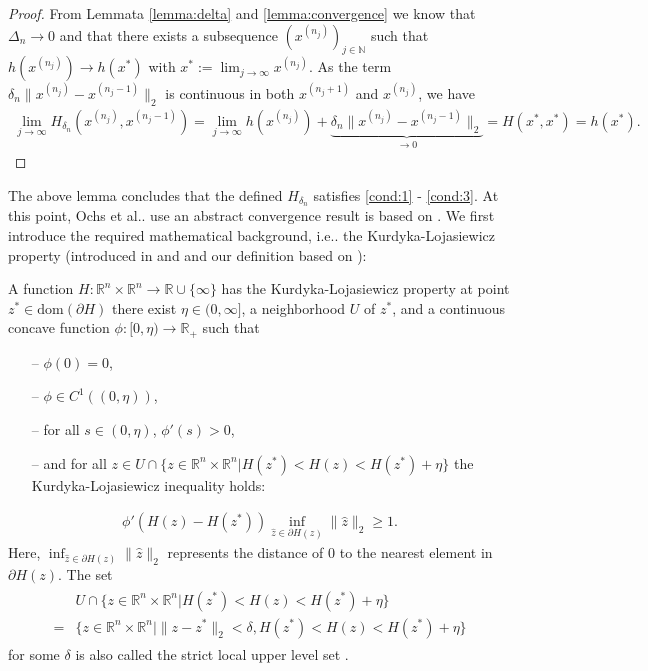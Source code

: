 \documentclass[onecolumn,final,a4paper,13pt,reqno]{siamart}
\makeatletter
\DeclareRobustCommand\onedot{\futurelet\@let@token\@onedot}
\def\@onedot{\ifx\@let@token.\else.\null\fi\xspace}
\def\ie{{i.e}\onedot} \def\Ie{{I.e}\onedot}
\def\etal{{et al}\onedot}
\def\dom{\text{dom}}
\makeatother
\begin{document}
\begin{proof}
	From Lemmata \ref{lemma:delta} and \ref{lemma:convergence} we know that $\Delta_n \rightarrow 0$ and that there exists a subsequence $(x^{(n_j)})_{j \in \mathbb{N}}$ such that $h(x^{(n_j)}) \rightarrow h(x^\ast)$ with $x^\ast := \lim_{j \rightarrow \infty} x^{(n_j)}$. As the term $\delta_n \|x^{(n_j)} - x^{(n_j - 1)}\|_2$ is continuous in both $x^{(n_j + 1)}$ and $x^{(n_j)}$, we have
	\begin{align}
		\lim_{j \rightarrow \infty} H_{\delta_n}(x^{(n_j)}, x^{(n_j - 1)})  = \lim_{j \rightarrow \infty} h(x^{(n_j)}) + \underbrace{\delta_n\|x^{(n_j)} - x^{(n_j - 1)}\|_2}_{\rightarrow 0} = H(x^\ast, x^\ast) = h(x^\ast).
	\end{align}
\end{proof}

The above lemma concludes that the defined $H_{\delta_n}$ satisfies \ref{cond:1} - \ref{cond:3}. At this point, Ochs \etal use an abstract convergence result is based on \cite{AttouchBolteSvaiter:2013}. We first introduce the required mathematical background, \ie the Kurdyka-Lojasiewicz property (introduced in \cite{Lojasiewicz:1993} and \cite{Kurdyka:1998} and our definition based on \cite{AttouchBolteRedontSoubeyran:2010}):

\begin{definitionmd}
	A function $H : \mathbb{R}^n \times \mathbb{R}^n \rightarrow \mathbb{R} \cup \{\infty\}$ has the Kurdyka-Lojasiewicz property at point $z^\ast \in \dom(\partial H)$ there exist $\eta \in (0,\infty]$, a neighborhood $U$ of $z^\ast$, and a continuous concave function $\phi : [0, \eta) \rightarrow \mathbb{R}_{+}$ such that
	\begin{itemize}
		\item[--] $\phi(0) = 0$,
		\item[--] $\phi \in C^1((0, \eta))$,
		\item[--] for all $s \in (0, \eta)$, $\phi'(s) > 0$,
		\item[--] and for all $z \in U \cap \{z \in \mathbb{R}^n \times \mathbb{R}^n | H(z^\ast) < H(z) < H(z^\ast) + \eta\}$ the Kurdyka-Lojasiewicz inequality holds:
	\end{itemize}
	\begin{align}
		\phi'(H(z) - H(z^\ast)) \inf_{\hat{z} \in \partial H(z)}\|\hat{z}\|_2 \geq 1.\label{eq:kl-inequality}
	\end{align}
	Here, $\inf_{\hat{z} \in \partial H(z)}\|\hat{z}\|_2$ represents the distance of $0$ to the nearest element in $\partial H(z)$. The set
	\begin{align}
		\begin{aligned}
			&U \cap \{z \in \mathbb{R}^n \times \mathbb{R}^n | H(z^\ast) < H(z) < H(z^\ast) + \eta\}\\
			= &\{z \in \mathbb{R}^n \times \mathbb{R}^n | \|z - z^\ast\|_2 < \delta, H(z^\ast) < H(z) < H(z^\ast) + \eta\}
		\end{aligned}
	\end{align}
	for some $\delta$ is also called the strict local upper level set \cite{FrankelGarrigosPeypuquet:2015}.\label{def:kl}
\end{definitionmd}
\end{document}

